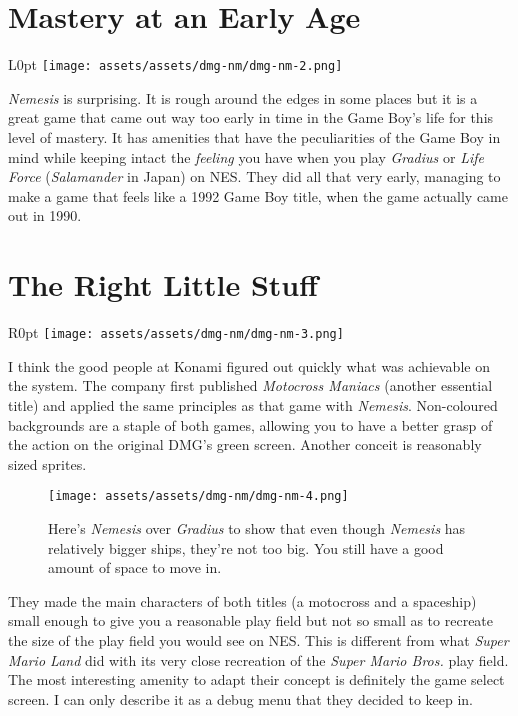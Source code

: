 \documentclass{book}
\begin{document}
\newpage\FloatBarrier\needspace{10mm}\section*{Mastery at an Early Age}\nopagebreak[4]
\begin{wrapfigure}{L}{0pt} \texttt{[image: assets/assets/dmg-nm/dmg-nm-2.png]}\end{wrapfigure}
\emph{Nemesis} is surprising. It is rough around the edges in some places but it is a great game that came out way too early in time in the Game Boy’s life for this level of mastery. It has amenities that have the peculiarities of the Game Boy in mind while keeping intact the \emph{feeling} you have when you play \emph{Gradius} or \emph{Life Force} (\emph{Salamander} in Japan) on NES. They did all that very early, managing to make a game that feels like a 1992 Game Boy title, when the game actually came out in 1990.

\FloatBarrier\needspace{10mm}\section*{The Right Little Stuff}\nopagebreak[4]

\begin{wrapfigure}{R}{0pt} \texttt{[image: assets/assets/dmg-nm/dmg-nm-3.png]}\end{wrapfigure}
I think the good people at Konami figured out quickly what was achievable on the system. The company first published \emph{Motocross Maniacs} (another essential title) and applied the same principles as that game with \emph{Nemesis}. Non-coloured backgrounds are a staple of both games, allowing you to have a better grasp of the action on the original DMG’s green screen. Another conceit is reasonably sized sprites.

\begin{figure}[hbt]
\vskip 10pt
\centering \texttt{[image: assets/assets/dmg-nm/dmg-nm-4.png]}\par\pagetwodescription Here’s \emph{Nemesis} over \emph{Gradius} to show that even though \emph{Nemesis} has relatively bigger ships, they’re not too big. You still have a good amount of space to move in.
\vskip 6pt
\end{figure}

They made the main characters of both titles (a motocross and a spaceship) small enough to give you a reasonable play field but not so small as to recreate the size of the play field you would see on NES. This is different from what \emph{Super Mario Land} did with its very close recreation of the \emph{Super Mario Bros.} play field. The most interesting amenity to adapt their concept is definitely the game select screen. I can only describe it as a debug menu that they decided to keep in.
\end{document}
